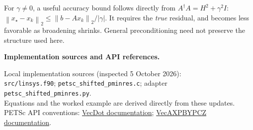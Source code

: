 \documentclass[10pt,letterpaper]{article}
\newcommand{\norm}[1]{\left\lVert #1\right\rVert_2}
\newcommand{\adj}{^{\dagger}}
\newcommand{\code}[1]{\texttt{#1}}
\begin{document}
For $\gamma\ne0$, a useful accuracy bound follows directly from
$A\adj A=H^2+\gamma^2I$:
$\norm{x_\star-x_k}\le\norm{b-Ax_k}/|\gamma|$.
It requires the \emph{true} residual, and becomes less favorable as broadening
shrinks. General preconditioning need not preserve the structure used here.

\vfill
{\footnotesize\color{ink}\textbf{Implementation sources and API references.}\par}
{\footnotesize
Local implementation sources (inspected 5 October 2026):\\
\code{src/linsys.f90}; \code{petsc\_shifted\_pminres.c}; adapter \code{petsc\_shifted\_pminres.py}.\\
Equations and the worked example are derived directly from these updates.
PETSc API conventions:
\href{https://petsc.org/release/manualpages/Vec/VecDot/}{VecDot documentation};
\href{https://petsc.org/release/manualpages/Vec/VecAXPBYPCZ/}{VecAXPBYPCZ documentation}.
}
\end{document}
